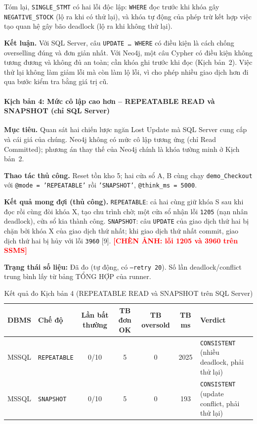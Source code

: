 Tóm lại, \texttt{SINGLE\_STMT} có hai lỗi độc lập: \texttt{WHERE} đọc trước khi khóa gây \texttt{NEGATIVE\_STOCK} (lộ ra khi có thử lại), và khóa tự động của phép trừ kết hợp việc tạo quan hệ gây bão deadlock (lộ ra khi không thử lại).

\textbf{Kết luận.} Với SQL Server, câu \texttt{UPDATE \ldots{} WHERE} có điều kiện là cách chống overselling đúng và đơn giản nhất. Với Neo4j, một câu Cypher có điều kiện không tương đương và không đủ an toàn; cần khóa ghi trước khi đọc (Kịch bản~2). Việc thử lại không làm giảm lỗi mà còn làm lộ lỗi, vì cho phép nhiều giao dịch hơn đi qua bước kiểm tra bằng giá trị cũ.

\paragraph{Kịch bản 4: Mức cô lập cao hơn -- REPEATABLE READ và SNAPSHOT (chỉ SQL Server)}
\label{par:tx-kb4}\mbox{}

\textbf{Mục tiêu.} Quan sát hai chiến lược ngăn Lost Update mà SQL Server cung cấp và cái giá của chúng. Neo4j không có mức cô lập tương ứng (chỉ Read Committed); phương án thay thế của Neo4j chính là khóa tường minh ở Kịch bản~2.

\textbf{Thao tác thủ công.} Reset tồn kho 5; hai cửa sổ A, B cùng chạy \texttt{demo\_Checkout} với \texttt{@mode = 'REPEATABLE'} rồi \texttt{'SNAPSHOT'}, \texttt{@think\_ms = 5000}.

\textbf{Kết quả mong đợi (thủ công).} \texttt{REPEATABLE}: cả hai cùng giữ khóa S sau khi đọc rồi cùng đòi khóa X, tạo chu trình chờ; một cửa sổ nhận lỗi \texttt{1205} (nạn nhân deadlock), cửa sổ kia thành công. \texttt{SNAPSHOT}: câu \texttt{UPDATE} của giao dịch thứ hai bị chặn bởi khóa X của giao dịch thứ nhất; khi giao dịch thứ nhất commit, giao dịch thứ hai bị hủy với lỗi \texttt{3960} [9]. \textcolor{red}{\textbf{[CHÈN ẢNH: lỗi 1205 và 3960 trên SSMS]}}

\textbf{Trạng thái số liệu:} Đã đo (tự động, có \texttt{--retry 20}). Số lần deadlock/conflict trung bình lấy từ bảng TỔNG HỢP của runner.

\begin{table}[htbp]
\centering
\caption{Kết quả đo Kịch bản 4 (REPEATABLE READ và SNAPSHOT trên SQL Server)}
\label{tab:tx-kb4}
\renewcommand{\arraystretch}{1.2}
\begin{tabularx}{\textwidth}{l l c c c c X}
\toprule
\textbf{DBMS} & \textbf{Chế độ} & \textbf{Lần bất thường} & \textbf{TB đơn OK} & \textbf{TB oversold} & \textbf{TB ms} & \textbf{Verdict} \\
\midrule
MSSQL & \texttt{REPEATABLE} & 0/10 & 5 & 0 & 2025 & \texttt{CONSISTENT} (nhiều deadlock, phải thử lại) \\
MSSQL & \texttt{SNAPSHOT} & 0/10 & 5 & 0 & 193 & \texttt{CONSISTENT} (update conflict, phải thử lại) \\
\bottomrule
\end{tabularx}
\end{table}

